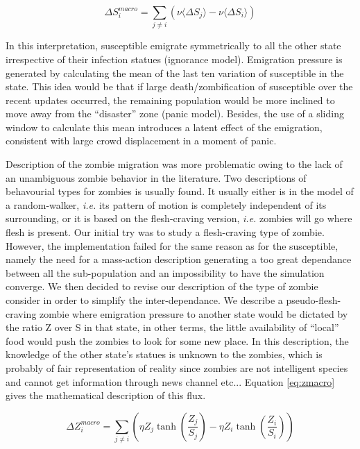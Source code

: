 \documentclass[11pt]{article} %
\begin{document}
\bigskip
\begin{equation} \label{eq:smacro}
\Delta S_{i}^{macro} =  \sum_{j\neq i}{ \left( \nu \langle \Delta S_{j} \rangle - \nu  \langle \Delta S_{i} \rangle \right) }
\end{equation}
\bigskip

In this interpretation, susceptible emigrate symmetrically to all the other state irrespective of their infection statues (ignorance model). Emigration pressure is generated by calculating the mean of the last ten variation of susceptible in the state. This idea would be that if large death/zombification of susceptible over the recent updates occurred, the remaining population would be more inclined to move away from the ``disaster'' zone (panic model). Besides, the use of a sliding window to calculate this mean introduces a latent effect of the emigration, consistent with large crowd displacement in a moment of panic. 

Description of the zombie migration was more problematic owing to the lack of an unambiguous zombie behavior in the literature. Two descriptions of behavourial types for zombies is usually found. It usually either is in the model of a random-walker, \textit{i.e.} its pattern of motion is completely independent of its surrounding, or it is based on the flesh-craving version, \textit{i.e.} zombies will go where flesh is present. Our initial try was to study a flesh-craving type of zombie. However, the implementation failed for the same reason as for the susceptible, namely the need for a mass-action description generating a too great dependance between all the sub-population and an impossibility to have the simulation converge. We then decided to revise our description of the type of zombie consider in order to simplify the inter-dependance. We describe a pseudo-flesh-craving zombie where emigration pressure to another state would be dictated by the ratio Z over S in that state, in other terms, the little availability of ``local'' food would push the zombies to look for some new place. In this description, the knowledge of the other state's statues is unknown to the zombies, which is probably of fair representation of reality since zombies are not intelligent species and cannot get information through news channel etc... Equation \eqref{eq:zmacro} gives the mathematical description of this flux. 

\bigskip
\begin{equation} \label{eq:zmacro}
\Delta Z_{i}^{macro} = \sum_{j\neq i}{\left( \eta Z_{j}\tanh \left( \frac{Z_{j}}{S_{j}}\right) -\eta Z_{i}\tanh \left( \frac{Z_{i}}{S_{i}}\right) \right)}
\end{equation}
\bigskip
\end{document}

